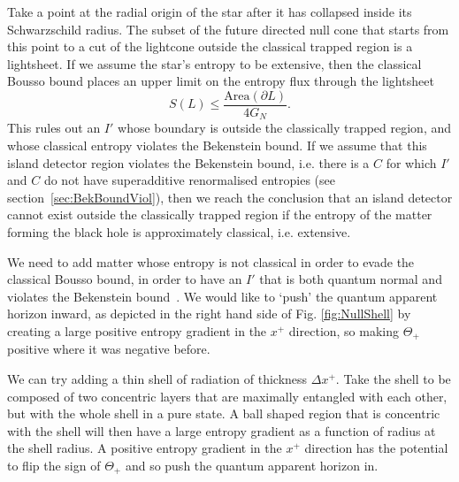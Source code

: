 \documentclass[a4paper,11pt]{article}
\newcommand{\cts}[1]{\ignorespaces}
\def\bne{\begin{equation}}
\def\ene{\end{equation}}
\newcommand{\del}{\partial}
\begin{document}
Take a point at the radial origin of the star after it has collapsed inside its Schwarzschild radius. The subset of the future directed null cone that starts from this point to a cut of the lightcone outside the classical trapped region is a lightsheet. If we assume the star's entropy to be extensive, then the classical Bousso bound places an upper limit on the entropy flux through the lightsheet
\bne S(L) \leq \frac{\text{Area}(\del L)}{4G_N}. \ene
\cts{$<$ or $\leq$?} This rules out an $I'$ whose boundary is outside the classically trapped region, and whose classical entropy violates the Bekenstein bound. If we assume that this island detector region violates the Bekenstein bound, i.e. there is a $C$ for which $I'$ and $C$ do not have superadditive renormalised entropies (see section~\ref{sec:BekBoundViol}), then we reach the conclusion that an island detector cannot exist outside the classically trapped region if the entropy of the matter forming the black hole is approximately classical, i.e. extensive. 
\cts{Think carefully about that statement.}

We need to add matter whose entropy is not classical in order to evade the classical Bousso bound, in order to have an $I'$ that is both quantum normal and violates the Bekenstein bound~\cite{Hartman2020}. We would like to `push' the quantum apparent horizon inward, as depicted in the right hand side of Fig. \ref{fig:NullShell} by creating a large positive entropy gradient in the $x^+$ direction, so making $\Theta_+$ positive where it was negative before. 


We can try adding a thin shell of radiation of thickness $\Delta x^+$. Take the shell to be composed of two concentric layers that are maximally entangled with each other, but with the whole shell in a pure state. A ball shaped region that is concentric with the shell will then have a large entropy gradient as a function of radius at the shell radius. 
A positive entropy gradient in the $x^+$ direction has the potential to flip the sign of $\Theta_+$ and so push the quantum apparent horizon in. 
\end{document}

